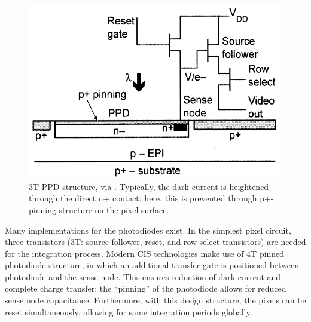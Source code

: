 \begin{figure}[h]
  \centering
  \includegraphics[width=\linewidth]{imgs/sensors/3tppd.png}
  \caption{3T PPD structure, via \cite{Holst2011}. Typically, the dark current is heightened through the direct n+ contact; here, this is prevented through p+-pinning structure on the pixel surface.}
  \label{fig:3tppd}
\end{figure}

Many implementations for the photodiodes exist. In the simplest pixel circuit, three transistors (3T: source-follower, reset, and row select transistors) are needed for the integration process. Modern CIS technologies make use of 4T pinned photodiode structure, in which an additional transfer gate is positioned between photodiode and the sense node. This ensures reduction of dark current and complete charge transfer; the ``pinning'' of the photodiode allows for reduced sense node capacitance. 
Furthermore, with this design structure, the pixels can be reset simultaneously, allowing for same integration periods globally.

